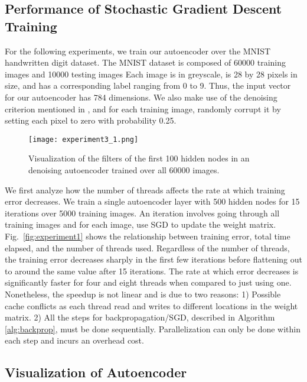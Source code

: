 \FloatBarrier
\subsection{Performance of Stochastic Gradient Descent Training}

For the following experiments, we train our autoencoder over the MNIST handwritten digit
dataset. The MNIST dataset is composed of 60000 training images and 10000
testing images Each image is in greyscale, is 28 by 28 pixels in size, and has
a corresponding label ranging from 0 to 9. Thus, the input vector for our
autoencoder has 784 dimensions. We also make use of the denoising criterion
mentioned in \cite{vincent2010stacked}, and for each training image, randomly
corrupt it by setting each pixel to zero with probability 0.25. 

\begin{figure}[h] \centering
	\texttt{[image: experiment3\_1.png]}
	\caption{Visualization of the filters of the first 100 hidden nodes in an
	denoising autoencoder trained over all 60000 images.}
	\label{fig:experiment3_1}
\end{figure}



We first analyze how the number of threads affects the rate at which training
error decreases. We train a single autoencoder layer with 500 hidden nodes for
15 iterations over 5000 training images. An iteration involves going through
all training images and for each image, use SGD to update the weight matrix.
Fig.~\ref{fig:experiment1} shows the relationship between training error, total
time elapsed, and the number of threads used. Regardless of the number of
threads, the training error decreases sharply in the first few iterations
before flattening out to around the same value after 15 iterations. The rate at
which error decreases is significantly faster for four and eight threads when
compared to just using one. Nonetheless, the speedup is not linear and is due
to two reasons: 1) Possible cache conflicts as each thread read and writes to
different locations in the weight matrix. 2) All the steps for
backpropagation/SGD, described in Algorithm \ref{alg:backprop}, must be done
sequentially. Parallelization can only be done within each step and incurs an
overhead cost.


\subsection{Visualization of Autoencoder}

